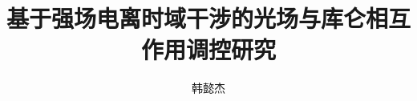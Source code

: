 \documentclass[bachelor]{thesis-hainanu}
\title{基于强场电离时域干涉的光场与库仑相互作用调控研究}{This is English name of your thesis title}
\author{韩懿杰}{Name Your}
\numberwithin{equation}{section}
\begin{document}
	
\makecover


\frontmatter



\thesistableofcontents


\mainmatter





%







%
% 
%
% 
% 
%
%
%
\end{document}
